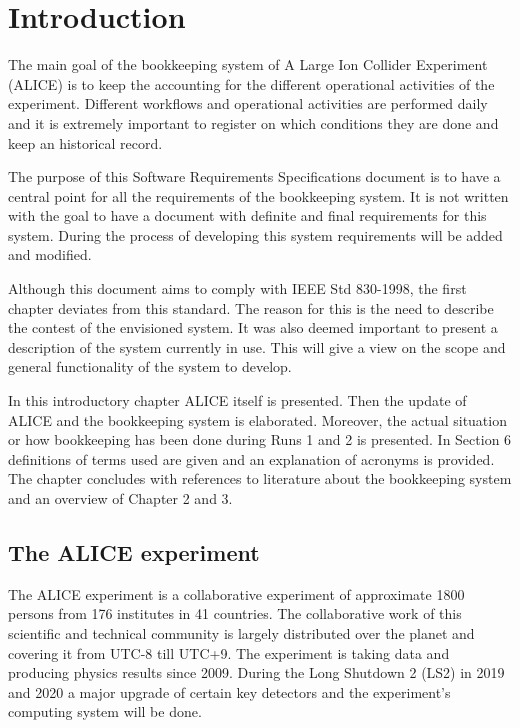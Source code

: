 \chapter{Introduction}
The main goal of the bookkeeping system of A Large Ion Collider Experiment (ALICE) is to keep the accounting for the different operational activities of the experiment. Different workflows and operational activities are performed daily and it is extremely important to register on which conditions they are done and keep an historical record. 

The purpose of this Software Requirements Specifications document is to have a central point for all the requirements of the bookkeeping system. It is not written with the goal to have a document with definite and final requirements for this system. During the process of developing this system requirements will be added and modified.

Although this document aims to comply with IEEE Std 830-1998, the first chapter deviates from this standard. The reason for this is the need to describe the contest of the envisioned system. It was also deemed important to present a description of the system currently in use. This will give a view on the scope and general functionality of the system to develop.

In this introductory chapter ALICE itself is presented. Then the update of ALICE and the bookkeeping system is elaborated. Moreover, the actual situation or how bookkeeping has been done during Runs 1 and 2 is presented. In Section 6 definitions of terms used are given and an explanation of acronyms is provided. The chapter concludes with references to literature about the bookkeeping system and an overview of Chapter 2 and 3.

\section{The ALICE experiment}
The ALICE experiment is a collaborative experiment of approximate 1800 persons from 176 institutes in 41 countries. The collaborative work of this scientific and technical community is largely distributed over the planet and covering it from UTC-8 till UTC+9. The experiment is taking data and producing physics results since 2009. During the Long Shutdown 2 (LS2) in 2019 and 2020 a major upgrade of certain key detectors and the experiment's computing system will be done. 


